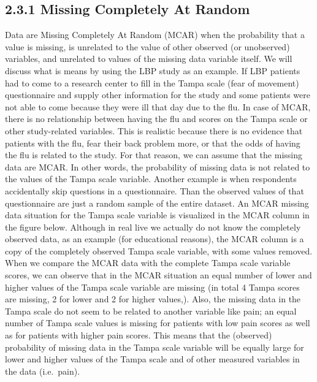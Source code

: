 \documentclass[]{book}
\begin{document}
\subsection{2.3.1 Missing Completely At
Random}\label{missing-completely-at-random}

Data are Missing Completely At Random (MCAR) when the probability that a
value is missing, is unrelated to the value of other observed (or
unobserved) variables, and unrelated to values of the missing data
variable itself. We will discuss what is means by using the LBP study as
an example. If LBP patients had to come to a research center to fill in
the Tampa scale (fear of movement) questionnaire and supply other
information for the study and some patients were not able to come
because they were ill that day due to the flu. In case of MCAR, there is
no relationship between having the flu and scores on the Tampa scale or
other study-related variables. This is realistic because there is no
evidence that patients with the flu, fear their back problem more, or
that the odds of having the flu is related to the study. For that
reason, we can assume that the missing data are MCAR. In other words,
the probability of missing data is not related to the values of the
Tampa scale variable. Another example is when respondents accidentally
skip questions in a questionnaire. Than the observed values of that
questionnaire are just a random sample of the entire dataset. An MCAR
missing data situation for the Tampa scale variable is visualized in the
MCAR column in the figure below. Although in real live we actually do
not know the completely observed data, as an example (for educational
reasons), the MCAR column is a copy of the completely observed Tampa
scale variable, with some values removed. When we compare the MCAR data
with the complete Tampa scale variable scores, we can observe that in
the MCAR situation an equal number of lower and higher values of the
Tampa scale variable are missing (in total 4 Tampa scores are missing, 2
for lower and 2 for higher values,). Also, the missing data in the Tampa
scale do not seem to be related to another variable like pain; an equal
number of Tampa scale values is missing for patients with low pain
scores as well as for patients with higher pain scores. This means that
the (observed) probability of missing data in the Tampa scale variable
will be equally large for lower and higher values of the Tampa scale and
of other measured variables in the data (i.e.~pain).
\end{document}

